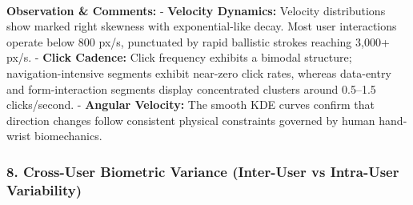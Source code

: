 \documentclass[11pt]{article}
\begin{document}
    \begin{center}
    \end{center}
    { \hspace*{\fill} \\}
    
    \textbf{Observation \& Comments:} - \textbf{Velocity Dynamics:} Velocity
distributions show marked right skewness with exponential-like decay.
Most user interactions operate below 800 px/s, punctuated by rapid
ballistic strokes reaching 3,000+ px/s. - \textbf{Click Cadence:} Click
frequency exhibits a bimodal structure; navigation-intensive segments
exhibit near-zero click rates, whereas data-entry and form-interaction
segments display concentrated clusters around 0.5--1.5 clicks/second. -
\textbf{Angular Velocity:} The smooth KDE curves confirm that direction
changes follow consistent physical constraints governed by human
hand-wrist biomechanics.

    \subsubsection{8. Cross-User Biometric Variance (Inter-User vs
Intra-User
Variability)}\label{cross-user-biometric-variance-inter-user-vs-intra-user-variability}
\end{document}
